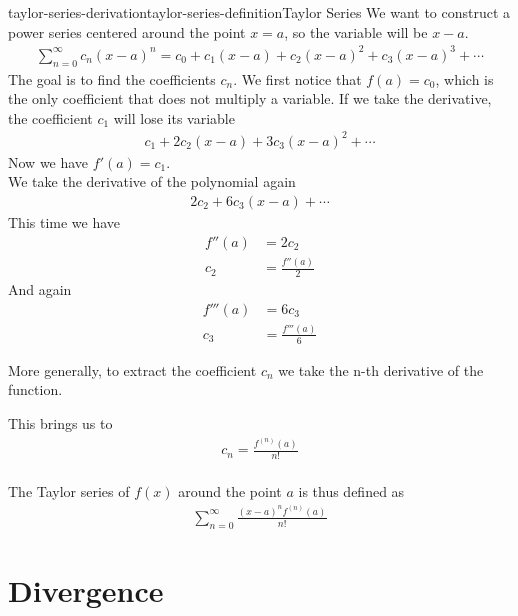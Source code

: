 \documentclass[preview]{standalone}
\begin{document}
\begin{snippetproof}{taylor-series-derivation}{taylor-series-definition}{Taylor Series}
    We want to construct a power series centered around the point \(x=a\),
    so the variable will be \(x-a\).
    \begin{align*}
        \sum_{n=0}^{\infty}c_n{(x-a)}^n
        =c_0+c_1(x-a)+c_2{(x-a)}^2+c_3{(x-a)}^3+\cdots
    \end{align*}
    The goal is to find the coefficients \(c_n\).
    We first notice that \(f(a)=c_0\), which is the only coefficient that does not multiply a variable.
    If we take the derivative, the coefficient \(c_1\) will lose its variable
    \begin{align*}
        c_1+2c_2(x-a)+3c_3{(x-a)}^2+\cdots
    \end{align*}
    Now we have \(f'(a)=c_1\).
    \\
    We take the derivative of the polynomial again
    \begin{align*}
        2c_2+6c_3(x-a)+\cdots
    \end{align*}
    This time we have
    \begin{align*}
        f''(a)&=2c_2\\
        c_2&=\frac{f''(a)}{2}
    \end{align*}
    And again
    \begin{align*}
        f'''(a)&=6c_3\\
        c_3&=\frac{f'''(a)}{6}
    \end{align*}

    More generally, to extract the coefficient \(c_n\) we take the n-th derivative of the function.

    This brings us to
    \begin{align*}
        c_n=\frac{f^{(n)}(a)}{n!}
    \end{align*}
    \\
    The Taylor series of \(f(x)\) around the point \(a\) is thus defined as
    \begin{align*}
        \sum_{n=0}^{\infty}\frac{{(x-a)}^n f^{(n)}(a)}{n!}
    \end{align*}
\end{snippetproof}

\section{Divergence}
\end{document}

